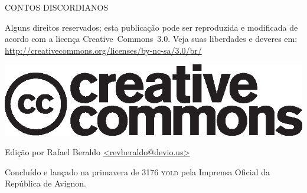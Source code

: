 \thispagestyle{empty}
\begin{center}
{\tiny
CONTOS DISCORDIANOS

\vspace{.5cm}

\begin{minipage}[h]{.5\textwidth}
Alguns direitos reservados; esta publicação pode ser reproduzida e modificada de acordo com a licença \foreignlanguage{english}{Creative~Commons~3.0}. Veja suas liberdades e deveres em: \url{http://creativecommons.org/licenses/by-nc-sa/3.0/br/}
	\begin{center}
	\includegraphics[scale=.2]{cc.eps}
	\end{center}
\end{minipage}

\vspace{.5cm}

\begin{minipage}[h]{.5\textwidth}
Edição por Rafael Beraldo \url{<revberaldo@devio.us>}
\end{minipage}

\vfill

\begin{minipage}[h]{.5\textwidth}
Concluído e lançado na primavera de 3176 \textsc{yold} pela Imprensa Oficial da República de Avignon.
\end{minipage}
}
\end{center}

\newpage
